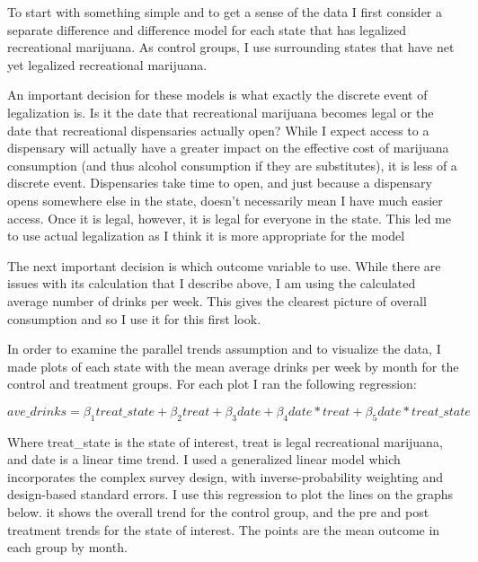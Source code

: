\documentclass[11pt]{article}
\begin{document}
To start with something simple and to get a sense of the data I first consider a separate difference and difference model for each state that has legalized recreational marijuana. As control groups, I use surrounding states that have net yet legalized recreational marijuana. \par

An important decision for these models is what exactly the discrete event of legalization is. Is it the date that recreational marijuana becomes legal or the date that recreational dispensaries actually open? While I expect access to a dispensary will actually have a greater impact on the effective cost of marijuana consumption (and thus alcohol consumption if they are substitutes), it is less of a discrete event. Dispensaries take time to open, and just because a dispensary opens somewhere else in the state, doesn't necessarily mean I have much easier access. Once it is legal, however, it is legal for everyone in the state. This led me to use actual legalization as I think it is more appropriate for the model \par 

The next important decision is which outcome variable to use. While there are issues with its calculation that I describe above, I am using the calculated average number of drinks per week. This gives the clearest picture of overall consumption and so I use it for this first look. \par

In order to examine the parallel trends assumption and to visualize the data, I made plots of each state with the mean average drinks per week by month for the control and treatment groups. For each plot I ran the following regression: 

$$
ave\_drinks =  \beta_1  treat\_state + \beta_2treat + \beta_3date +  \beta_4date*treat + \beta_5date*treat\_state
$$

Where treat\_state is the state of interest, treat is legal recreational marijuana, and date is a linear time trend. I used a generalized linear model which incorporates the complex survey design, with inverse-probability weighting and design-based standard errors. I use this regression to plot the lines on the graphs below. it shows the overall trend for the control group, and the pre and post treatment trends for the state of interest.  The points are the mean outcome in each group by month. \par
\end{document}
